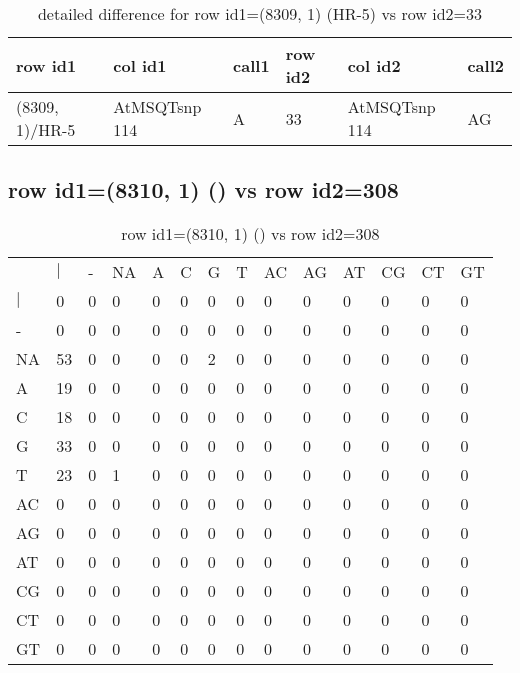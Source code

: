 \begin{center}
\begin{longtable}{|l|l|l|l|l|l|}
\caption{detailed difference for row id1=(8309, 1) (HR-5) vs row id2=33} \label{table_dm299}\\
\hline
row id1&col id1&call1&row id2&col id2&call2\\
\hline
(8309, 1)/HR-5&AtMSQTsnp 114&A&33&AtMSQTsnp 114&AG\\
\hline
\end{longtable}
\end{center}

\subsection{row id1=(8310, 1) () vs row id2=308}
\begin{center}
\begin{longtable}{|l|l|l|l|l|l|l|l|l|l|l|l|l|l|}
\caption{row id1=(8310, 1) () vs row id2=308} \label{table_dm300}\\
\hline
\\
\hline
&$|$&-&NA&A&C&G&T&AC&AG&AT&CG&CT&GT\\
$|$&0&0&0&0&0&0&0&0&0&0&0&0&0\\
-&0&0&0&0&0&0&0&0&0&0&0&0&0\\
NA&53&0&0&0&0&2&0&0&0&0&0&0&0\\
A&19&0&0&0&0&0&0&0&0&0&0&0&0\\
C&18&0&0&0&0&0&0&0&0&0&0&0&0\\
G&33&0&0&0&0&0&0&0&0&0&0&0&0\\
T&23&0&1&0&0&0&0&0&0&0&0&0&0\\
AC&0&0&0&0&0&0&0&0&0&0&0&0&0\\
AG&0&0&0&0&0&0&0&0&0&0&0&0&0\\
AT&0&0&0&0&0&0&0&0&0&0&0&0&0\\
CG&0&0&0&0&0&0&0&0&0&0&0&0&0\\
CT&0&0&0&0&0&0&0&0&0&0&0&0&0\\
GT&0&0&0&0&0&0&0&0&0&0&0&0&0\\
\hline
\end{longtable}
\end{center}

